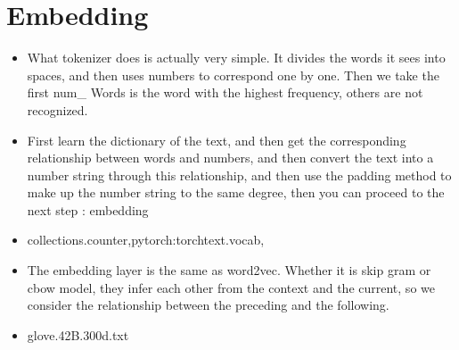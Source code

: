 \documentclass{amsart}
\begin{document}
\section{Embedding}
\begin{itemize}
  \item What tokenizer does is actually very simple. It divides the words it sees into spaces, and then uses numbers to correspond one by one. Then we take the first num_ Words is the word with the highest frequency, others are not recognized.
  \item First learn the dictionary of the text, and then get the corresponding relationship between words and numbers, and then convert the text into a number string through this relationship, and then use the padding method to make up the number string to the same degree, then you can proceed to the next step : embedding
  \item collections.counter,pytorch:torchtext.vocab,
  \item The embedding layer is the same as word2vec. Whether it is skip gram or cbow model, they infer each other from the context and the current, so we consider the relationship between the preceding and the following. 
  \item glove.42B.300d.txt
\end{itemize}
\end{document}
